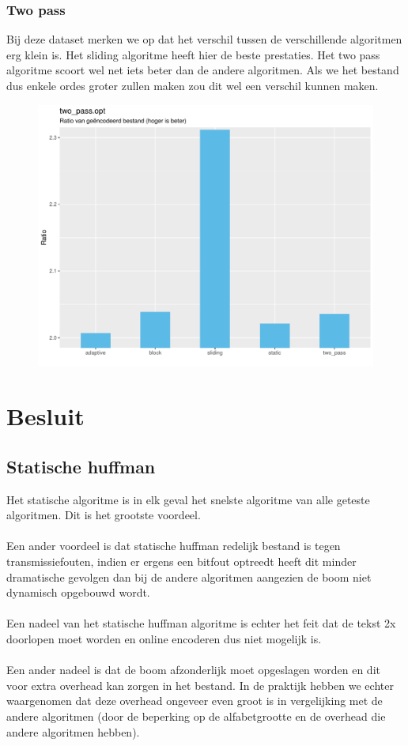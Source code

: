 \documentclass[a4paper,12pt]{report}
\begin{document}
\subsection{Two pass}
Bij deze dataset merken we op dat het verschil tussen de verschillende algoritmen erg klein is. Het sliding algoritme heeft hier de beste prestaties. Het two pass algoritme scoort wel net iets beter dan de andere algoritmen. Als we het bestand dus enkele ordes groter zullen maken zou dit wel een verschil kunnen maken.
\begin{figure}[H]
	\includegraphics[scale=0.8]{../experimenten/grafieken/two_pass_opt}
\end{figure}

\chapter{Besluit}
\section{Statische huffman}
Het statische algoritme is in elk geval het snelste algoritme van alle geteste algoritmen. Dit is het grootste voordeel. \\ \\
Een ander voordeel is dat statische huffman redelijk bestand is tegen transmissiefouten, indien er ergens een bitfout optreedt heeft dit minder dramatische gevolgen dan bij de andere algoritmen aangezien de boom niet dynamisch opgebouwd wordt. \\ \\
Een nadeel van het statische huffman algoritme is echter het feit dat de tekst 2x doorlopen moet worden en online encoderen dus niet mogelijk is. \\ \\
Een ander nadeel is dat de boom afzonderlijk moet opgeslagen worden en dit voor extra overhead kan zorgen in het bestand. In de praktijk hebben we echter waargenomen dat deze overhead ongeveer even groot is in vergelijking met de andere algoritmen (door de beperking op de alfabetgrootte en de overhead die andere algoritmen hebben).
\end{document}

